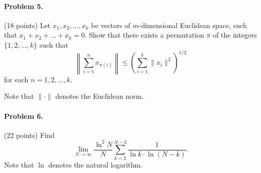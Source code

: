 \documentclass{article}
\begin{document}
\paragraph{Problem 5.} (18 points)
Let $x_1, x_2, \ldots, x_k$ be vectors of $m$-dimensional Euclidean space,
such that $x_1 + x_2 + \ldots + x_k = 0$.
Show that there exists a permutation $\pi$ of
the integers $\{1, 2, \ldots, k\}$ such that
\[
\left\| \sum_{i=1}^n x_{\pi(i)} \right\| \leq \left( \sum_{i=1}^k \|x_i\|^2 \right)^{1/2}
\]
for each $n = 1, 2, \ldots, k$.

Note that $\|\cdot\|$ denotes the Euclidean norm.

\paragraph{Problem 6.} (22 points)
Find
\[
\lim_{N \to \infty} \frac{\ln^2 N}{N} \sum_{k=2}^{N-2} \frac{1}{\ln k \cdot \ln(N-k)}.
\]
Note that $\ln$ denotes the natural logarithm.
\end{document}
